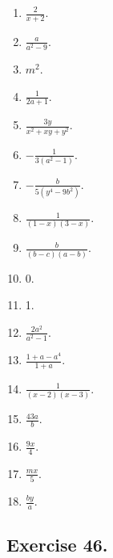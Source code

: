 \documentclass{book}
\begin{document}
\begin{enumerate}
\item $\displaystyle \frac{2}{x + 2}$.

\item $\displaystyle \frac{a}{a^{2} - 9}$.

\item $m^{2}$.

\item $\displaystyle \frac{1}{2 a + 1}$.

\item $\displaystyle \frac{3 y}{x^{2} + x y + y^{2}}$.

\item $\displaystyle - \frac{1}{3(a^{2} - 1)}$.

\item $\displaystyle - \frac{b}{5(y^{4} - 9 b^{2})}$.

\item $\displaystyle \frac{1}{(1 - x)(3 - x)}$.

\item $\displaystyle \frac{b}{(b - c)(a - b)}$.

\item 0.

\item 1.

\item $\displaystyle \frac{2 a^{2}}{a^{2} - 1}$.

\item $\displaystyle \frac{1 + a - a^{4}}{1 + a}$.

\item $\displaystyle \frac{1}{(x - 2)(x - 3)}$.

\item $\displaystyle \frac{43 a}{b}$.

\item $\displaystyle \frac{9 x}{4}$.

\item $\displaystyle \frac{m x}{5}$.

\item $\displaystyle \frac{b y}{a}$.
\end{enumerate}

\subsection*{Exercise 46.}
\end{document}

